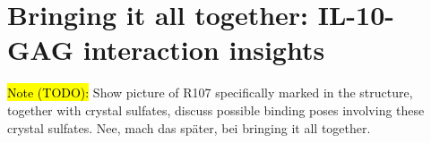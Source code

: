 \chapter{Bringing it all together: IL-10-GAG interaction insights}
\lipsum[1-10]


\hl{Note (TODO):}
Show picture of R107 specifically marked in the structure, together with
crystal sulfates, discuss possible binding poses involving these crystal
sulfates. Nee, mach das später, bei bringing it all together.